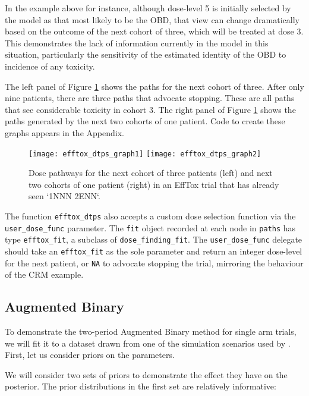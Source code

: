 \documentclass[article]{jss}
\begin{document}
In the example above for instance, although dose-level 5 is initially
selected by the model as that most likely to be the OBD, that view can
change dramatically based on the outcome of the next cohort of three,
which will be treated at dose 3. This demonstrates the lack of
information currently in the model in this situation, particularly the
sensitivity of the estimated identity of the OBD to incidence of any
toxicity.

The left panel of Figure \ref{fig:efftox_dtps_graph} shows the paths for
the next cohort of three. After only nine patients, there are three
paths that advocate stopping. These are all paths that see considerable
toxicity in cohort 3. The right panel of Figure
\ref{fig:efftox_dtps_graph} shows the paths generated by the next two
cohorts of one patient. Code to create these graphs appears in the
Appendix.

\begin{figure}
  \centering
  \texttt{[image: efftox\_dtps\_graph1]}
  \texttt{[image: efftox\_dtps\_graph2]}
  \caption{Dose pathways for the next cohort of three patients (left) and next two cohorts of one patient (right) in an EffTox trial that has already seen `1NNN 2ENN`.}
  \label{fig:efftox_dtps_graph}
\end{figure}

The function \texttt{efftox\_dtps} also accepts a custom dose selection
function via the \texttt{user\_dose\_func} parameter. The \texttt{fit}
object recorded at each node in \texttt{paths} has type
\texttt{efftox\_fit}, a subclass of \texttt{dose\_finding\_fit}. The
\texttt{user\_dose\_func} delegate should take an \texttt{efftox\_fit}
as the sole parameter and return an integer dose-level for the next
patient, or \texttt{NA} to advocate stopping the trial, mirroring the
behaviour of the CRM example.

\hypertarget{augmented-binary}{%
\subsection{Augmented Binary}\label{augmented-binary}}

To demonstrate the two-period Augmented Binary method for single arm
trials, we will fit it to a dataset drawn from one of the simulation
scenarios used by \citet{Wason2013}. First, let us consider priors on
the parameters.

We will consider two sets of priors to demonstrate the effect they have
on the posterior. The prior distributions in the first set are
relatively informative:
\end{document}
